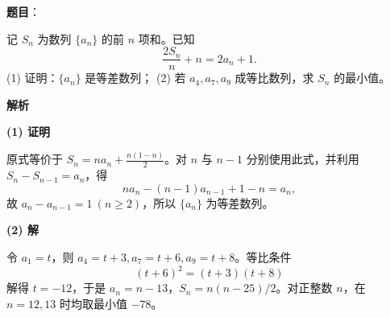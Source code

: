 \begin{answer}

\textbf{题目}：

记 $S_n$ 为数列 $\{a_n\}$ 的前 $n$ 项和。已知
\nopagebreak[4]
\[\frac{2S_n}{n}+n=2a_n+1.\]
(1) 证明：$\{a_n\}$ 是等差数列；  
(2) 若 $a_4,a_7,a_9$ 成等比数列，求 $S_n$ 的最小值。

\textbf{解析}

\textbf{(1) 证明}

原式等价于 $S_n=na_n+\frac{n(1-n)}2$。对 $n$ 与 $n-1$ 分别使用此式，并利用 $S_n-S_{n-1}=a_n$，得
\nopagebreak[4]
\[na_n-(n-1)a_{n-1}+1-n=a_n,\]
故 $a_n-a_{n-1}=1\ (n\geq2)$，所以 $\{a_n\}$ 为等差数列。

\textbf{(2) 解}

令 $a_1=t$，则 $a_4=t+3,a_7=t+6,a_9=t+8$。等比条件
\nopagebreak[4]
\[(t+6)^2=(t+3)(t+8)\]
解得 $t=-12$，于是 $a_n=n-13$，$S_n=n(n-25)/2$。对正整数 $n$，在 $n=12,13$ 时均取最小值 $-78$。



\end{answer}
